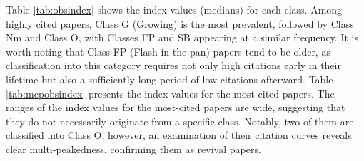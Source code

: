 Table \ref{tab:obsindex} shows the index values (medians) for each class.
Among highly cited papers, Class G (Growing) is the most prevalent, followed by Class Nm and Class O, with Classes FP and SB appearing at a similar frequency.
It is worth noting that Class FP (Flash in the pan) papers tend to be older, as classification into this category requires not only high citations early in their lifetime but also a sufficiently long period of low citations afterward.
Table \ref{tab:mcpobsindex} presents the index values for the most-cited papers.
The ranges of the index values for the most-cited papers are wide, suggesting that they do not necessarily originate from a specific class.
Notably, two of them are classified into Class O; however, an examination of their citation curves reveals clear multi-peakedness, confirming them as revival papers.


